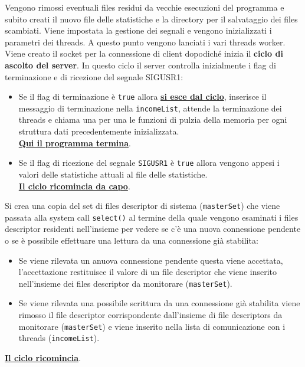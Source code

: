 \documentclass[a4paper,12pt]{report}
\begin{document}
Vengono rimossi eventuali files residui da vecchie esecuzioni del programma e subito creati il nuovo file delle statistiche e la directory per il salvataggio dei files scambiati. Viene impostata la gestione dei segnali e vengono inizializzati i parametri dei threads. A questo punto vengono lanciati i vari threads worker. Viene creato il socket per la connessione di client dopodiché inizia il \textbf{ciclo di ascolto del server}. In questo ciclo il server controlla inizialmente i flag di terminazione e di ricezione del segnale SIGUSR1:
\begin{itemize}
\item Se il flag di terminazione è \texttt{true} allora  \textbf{\underline{si esce dal ciclo}}, inserisce il messaggio di terminazione nella \texttt{incomeList}, attende la terminazione dei threads e chiama una per una le funzioni di pulzia della memoria per ogni struttura dati precedentemente inizializzata.\\ \textbf{\underline{Qui il programma termina}}.
\item Se il flag di ricezione del segnale \texttt{SIGUSR1} è \texttt{true} allora vengono appesi i valori delle statistiche attuali al file delle statistiche.\\ \textbf{\underline{Il ciclo ricomincia da capo}}.
\end{itemize}
Si crea una copia del set di files descriptor di sistema (\texttt{masterSet}) che viene passata alla system call \texttt{select()} al termine della quale vengono esaminati i files descriptor residenti nell'insieme per vedere se c'è una nuova connessione pendente o se è possibile effettuare una lettura da una connessione già stabilita:
\begin{itemize}
\item Se viene rilevata un anuova connessione pendente questa viene accettata, l'accettazione restituisce il valore di un file descriptor che viene inserito nell'insieme dei files descriptor da monitorare (\texttt{masterSet}).
\item Se viene rilevata una possibile scrittura da una connessione già stabilita viene rimosso il file descriptor corrispondente dall'insieme di file descriptors da monitorare (\texttt{masterSet}) e viene inserito nella lista di comunicazione con i threads (\texttt{incomeList}).
\end{itemize}
\textbf{\underline{Il ciclo ricomincia}}.
\end{document}
